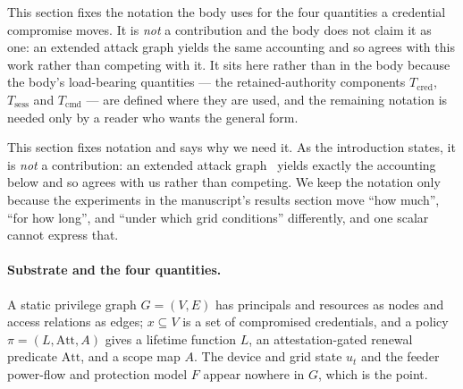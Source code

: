 \documentclass[review]{elsarticle}
\begin{document}
This section fixes the notation the body uses for the four quantities a credential compromise
moves. It is \emph{not} a contribution and the body does not claim it as one: an extended attack
graph yields the same accounting and so agrees with this work rather than competing with it. It
sits here rather than in the body because the body's load-bearing quantities --- the
retained-authority components $T_{\mathrm{cred}}$, $T_{\mathrm{sess}}$ and $T_{\mathrm{cmd}}$ ---
are defined where they are used, and the remaining notation is needed only by a reader who wants
the general form.

This section fixes notation and says why we need it. As the introduction states, it is \emph{not} a
contribution: an extended attack
graph~\cite{poolsappasit2012dynamic,wang2008attackgraph,frigault2008measuring} yields exactly the
accounting below and so agrees with us rather than competing. We keep the notation only because the
experiments in the manuscript's results section move ``how much'', ``for how long'', and ``under which grid
conditions'' differently, and one scalar cannot express that.

\paragraph{Substrate and the four quantities.}
A static privilege graph $G=(V,E)$ has principals and resources as nodes and access relations as
edges; $x \subseteq V$ is a set of compromised credentials, and a policy $\pi=(L,\mathrm{Att},A)$
gives a lifetime function $L$, an attestation-gated renewal predicate $\mathrm{Att}$, and a scope
map $A$. The device and grid state $u_t$ and the feeder power-flow and protection model $F$ appear
nowhere in $G$, which is the point.
\end{document}
